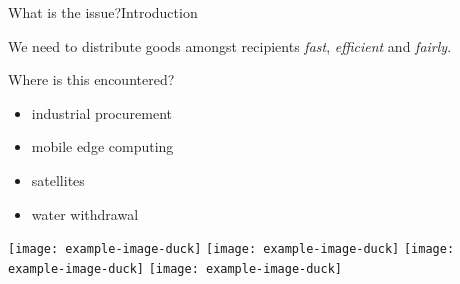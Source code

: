 \begin{frame}{What is the issue?}{Introduction}
	\adjustfortopblock
	\begin{block}{}
		We need to distribute goods amongst recipients \emph{fast}, \emph{efficient} and \emph{fairly}.
	\end{block}

	Where is this encountered?
	\begin{itemize}
		\item
		industrial procurement

		\item
		mobile edge computing

		\item
		satellites

		\item
		water withdrawal
	\end{itemize}

	\begin{center}
		\texttt{[image: example-image-duck]}
		\hfill
		\texttt{[image: example-image-duck]}
		\hfill
		\texttt{[image: example-image-duck]}
		\hfill
		\texttt{[image: example-image-duck]}
	\end{center}
\end{frame}